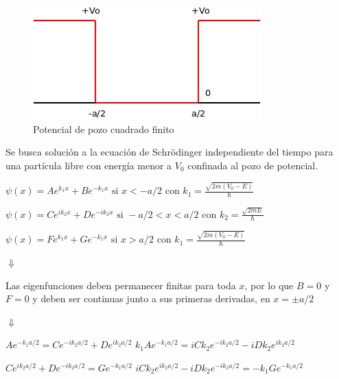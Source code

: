 \documentclass[oneside]{book}
\numberwithin{equation}{section}
\numberwithin{figure}{section}
\numberwithin{table}{section}
\begin{document}
				\begin{figure}[H]
					\begin{center}
						\includegraphics[scale=1]{PozoFinito.jpeg}
						\caption{Potencial de pozo cuadrado finito}
					\end{center}
				\end{figure}				
				
				Se busca solución a la ecuación de Schrödinger independiente del tiempo para una partícula libre con energía menor a $V_0$ confinada al pozo de potencial.\\
				
				\begin{center}
					$\displaystyle \psi(x)=Ae^{k_1x}+Be^{-k_1x} \text{ si } x<-a/2 \text{ con } k_1=\frac{\sqrt{2m(V_0-E)}}{\hbar}$				
				\end{center}
				\begin{center}
					$\displaystyle \psi(x)=Ce^{ik_2x}+De^{-ik_2x} \text{ si } -a/2<x<a/2 \text{ con } k_2=\frac{\sqrt{2mE}}{\hbar}$
				\end{center}
				\begin{center}
					$\displaystyle \psi(x)=Fe^{k_1x}+Ge^{-k_1x} \text{ si } x>a/2 \text{ con } k_1=\frac{\sqrt{2m(V_0-E)}}{\hbar}$
				\end{center}
				\begin{center}
					$\Downarrow$
				\end{center}
				
				Las eigenfunciones deben permanecer finitas para toda $x$, por lo que $B=0$ y $F=0$ y deben ser continuas junto a sus primeras derivadas, en $x=\pm a/2$
				
				\begin{center}
					$\Downarrow$
				\end{center}
				\begin{center}
					$\displaystyle Ae^{-k_1a/2}=Ce^{-ik_2a/2}+De^{ik_2a/2}$	\hspace{1cm}	$\displaystyle k_1Ae^{-k_1a/2}=iCk_2e^{-ik_2a/2}-iDk_2e^{ik_2a/2}$		
				\end{center}
				\begin{center}
					$\displaystyle Ce^{ik_2a/2}+De^{-ik_2a/2}=Ge^{-k_1a/2}$	\hspace{1cm} $\displaystyle iCk_2e^{ik_2a/2}-iDk_2e^{-ik_2a/2}=-k_1Ge^{-k_1a/2}$		
				\end{center}
				
\end{document}
